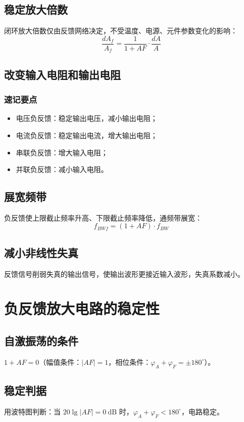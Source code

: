 \subsection{稳定放大倍数}
闭环放大倍数仅由反馈网络决定，不受温度、电源、元件参数变化的影响：
\[
\frac{dA_f}{A_f} = \frac{1}{1 + AF} \cdot \frac{dA}{A}
\]

\subsection{改变输入电阻和输出电阻}
\subsubsection{速记要点}
\begin{itemize}
    \item 电压负反馈：稳定输出电压，减小输出电阻；
    \item 电流负反馈：稳定输出电流，增大输出电阻；
    \item 串联负反馈：增大输入电阻；
    \item 并联负反馈：减小输入电阻。
\end{itemize}

\subsection{展宽频带}
负反馈使上限截止频率升高、下限截止频率降低，通频带展宽：
\[
f_{BWf} = (1 + AF) \cdot f_{BW}
\]

\subsection{减小非线性失真}
反馈信号削弱失真的输出信号，使输出波形更接近输入波形，失真系数减小。

\section{负反馈放大电路的稳定性}
\subsection{自激振荡的条件}
$1 + AF = 0$（幅值条件：$|AF| = 1$，相位条件：$\varphi_A + \varphi_F = \pm 180^\circ$）。

\subsection{稳定判据}
用波特图判断：当 $20\lg|AF| = 0\ \text{dB}$ 时，$\varphi_A + \varphi_F < 180^\circ$，电路稳定。

